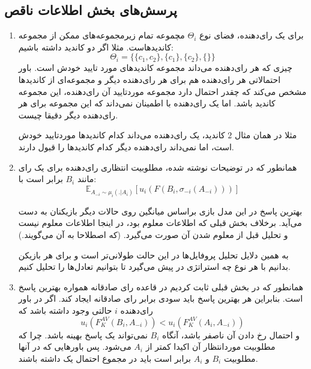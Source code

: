 \documentclass[12pt]{article}
\begin{document}
\subsection{پرسش‌های بخش اطلاعات ناقص}

\begin{enumerate}
    \item {
        برای یک رای‌دهنده، فضای نوع 
        $\Theta_i$
        مچموعه تمام زیرمجموعه‌های ممکن از مجموعه کاندیدهاست. مثلا اگر دو
        کاندید داشته باشیم:
        \[
        \Theta_i = \{\{c_1,c_2\}, \{c_1\}, \{c_2\}, \{\}\}
        \]
        چیزی که هر رای‌دهنده می‌داند مجموعه کاندیدهای مورد تایید خودش است.
        باور احتمالاتی هر رای‌دهنده هم برای 
        هر رای‌دهنده دیگر و مجموعه‌ای از کاندیدها مشخص می‌کند که 
        چقدر احتمال دارد مجموعه موردتایید آن رای‌دهنده، این مجموعه کاندید باشد.
        اما یک رای‌دهنده با اطمینان نمی‌داند که این مجموعه برای هر رای‌دهنده دیگر
        دقیقا چیست.

        مثلا در همان مثال 
        \(2\)
        کاندید، یک رای‌دهنده می‌داند کدام کاندیدها موردتایید
        خودش است، اما نمی‌داند رای‌دهنده دیگر کدام کاندیدها را قبول دارند.
    }
    \item {
        همانطور که در توضیحات نوشته شده، مطلوبیت انتظاری رای‌دهنده
        برای یک رای مانند 
        $B_i$
        برابر است با:
        \[
        \mathbb{E}_{A_{-i}\sim \mu_i(.| A_i)} [u_i(F(B_i, \sigma_{-i}(A_{-i})))]
        \]

        بهترین پاسخ در این مدل بازی 
        براساس میانگین روی حالات دیگر بازیکنان به دست می‌آید. برخلاف
        بخش قبلی که اطلاعات معلوم بود، در اینجا اطلاعات معلوم نیست و 
        تحلیل قبل از معلوم شدن آن صورت می‌گیرد. 
        (که اصطلاحا به آن  می‌گویند.)

        به همین دلایل تحلیل پروفایل‌ها در این حالت طولانی‌تر است و برای هر بازیکن
        بدانیم با هر نوع چه استراتژی در پیش می‌گیرد تا بتوانیم تعادل‌ها را تحلیل کنیم.
    }
    \item {
        همانطور که در بخش قبلی ثابت کردیم در قاعده
        رای صادقانه همواره بهترین پاسخ است. بنابراین هر بهترین پاسخ
        باید سودی برابر رای صادقانه ایجاد کند. اگر در باور رای‌دهنده
        $i$ 
        حالتی وجود داشته باشد که
        \[
        u_i(F_K^{AV}(B_i, A_{-i})) < u_i(F_K^{AV}(A_i, A_{-i}))
        \]
        و احتمال رخ دادن آن ناصفر باشد، آنگاه $B_i$ 
        نمی‌تواند یک پاسخ بهینه باشد. چرا که مطلوبیت موردانتظار آن اکیدا کمتر از 
        $A_i$
        می‌شود. پس باورهایی که در آنها مطلوبیت 
        $B_i$ 
        و
        $A_{i}$
        برابر است باید در مجموع احتمال یک داشته باشند.

}
\end{enumerate}
\end{document}
